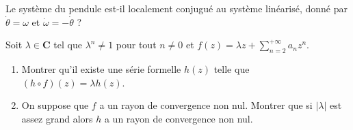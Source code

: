 \documentclass[a4paper,10pt,openany]{article}
\theoremstyle{plain}
\theoremstyle{definition}
\newcommand{\C}{\mathbf{C}}
\begin{document}
\noindent Le syst\`eme du pendule est-il localement conjugu\'e au syst\`eme lin\'earis\'e, donn\'e par $\dot \theta = \omega$ et $\dot \omega = -\dot \theta$ ?

\vspace{0.6cm}

 \vspace{1.5mm} 

\noindent Soit $\lambda \in \C$ tel que $\lambda^n \neq 1$ pour tout $n \neq 0$ et $\displaystyle{f(z) = \lambda z + \sum_{n=2}^{+\infty} a_n z^n}$. 
\begin{enumerate}
\item Montrer qu'il existe une s\'erie formelle $h(z)$ telle que $(h \circ f)(z) = \lambda h(z)$.
\item On suppose que $f$ a un rayon de convergence non nul. Montrer que si $|\lambda|$ est assez grand alors $h$ a un rayon de convergence non nul.
\end{enumerate}

\noindent
\end{document}
